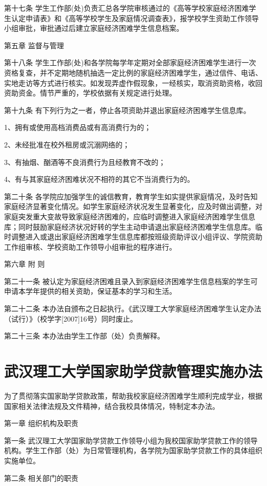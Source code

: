 \documentclass[UTF8,12pt,a4paper]{report}
\begin{document}
第十七条 学生工作部(处)负责汇总各学院审核通过的《高等学校家庭经济困难学生认定申请表》和《高等学校学生及家庭情况调查表》，报学校学生资助工作领导小组审批，审批通过后建立家庭经济困难学生信息档案。

第五章 监督与管理

第十八条 学生工作部(处)和各学院每学年定期对全部家庭经济困难学生进行一次资格复查，并不定期地随机抽选一定比例的家庭经济困难学生，通过信件、电话、实地走访等方式进行核实。如发现弄虚作假现象，一经核实，取消资助资格，收回资助资金。情节严重的，学校依据有关规定进行处理。

第十九条 有下列行为之一者，停止各项资助并退出家庭经济困难学生信息库。

1、拥有或使用高档消费品或有高消费行为的；

2、未经批准在校外租房或沉溺网络的；

3、有抽烟、酗酒等不良消费行为且经教育不改的；

4、有与其家庭经济困难状况不相符的其它不当消费行为的。

第二十条 各学院应加强学生的诚信教育，教育学生如实提供家庭情况，及时告知家庭经济显著变化情况。如学生家庭经济状况发生显著变化，应及时做出调整，对家庭突发重大变故导致家庭经济困难的，应临时调整进入家庭经济困难学生信息库；同时鼓励家庭经济状况好转的学生主动申请退出家庭经济困难学生信息库。临时调整进入或退出家庭经济困难学生信息库都按班级资助评议小组评议、学院资助工作组审核、学校资助工作领导小组审批的程序进行。

第六章 附 则

第二十一条 被认定为家庭经济困难且录入到家庭经济困难学生信息档案的学生可申请本学年提供的相关资助，保证基本的学习和生活。

第二十二条 本办法自颁布之日起执行。《武汉理工大学家庭经济困难学生认定办法（试行）》（校学字[2007]16号）同时废止。

第二十三条 本办法由学生工作部（处）负责解释。

\chapter{武汉理工大学国家助学贷款管理实施办法}
为了贯彻落实国家助学贷款政策，帮助我校家庭经济困难学生顺利完成学业，根据国家相关法律法规及文件精神，结合我校具体情况，特制定本办法。

第一章 组织机构及职责

第一条 武汉理工大学国家助学贷款工作领导小组为我校国家助学贷款工作的领导机构。学生工作部（处）为日常管理机构，各学院为国家助学贷款工作的具体组织实施单位。

第二条 相关部门的职责
\end{document}
